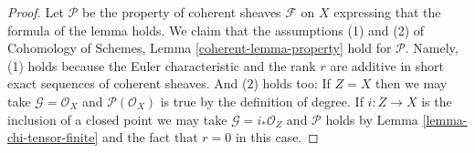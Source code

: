 \documentclass[10pt,a4paper]{amsart}
\theoremstyle{plain}
\theoremstyle{definition}
\theoremstyle{remark}
\numberwithin{equation}{subsection}
\begin{document}
\begin{proof}
Let $\mathcal{P}$ be the property of coherent sheaves $\mathcal{F}$
on $X$ expressing that the formula of the lemma holds. We claim that
the assumptions (1) and (2) of
Cohomology of Schemes, Lemma \ref{coherent-lemma-property}
hold for $\mathcal{P}$. Namely, (1) holds because the Euler characteristic
and the rank $r$ are additive in short exact sequences of coherent sheaves.
And (2) holds too: If $Z = X$ then we may take
$\mathcal{G} = \mathcal{O}_X$ and $\mathcal{P}(\mathcal{O}_X)$
is true by the definition of degree. If $i : Z \to X$ is the inclusion
of a closed point we may take $\mathcal{G} = i_*\mathcal{O}_Z$
and $\mathcal{P}$ holds by Lemma \ref{lemma-chi-tensor-finite}
and the fact that $r = 0$ in this case.
\end{proof}
\end{document}
